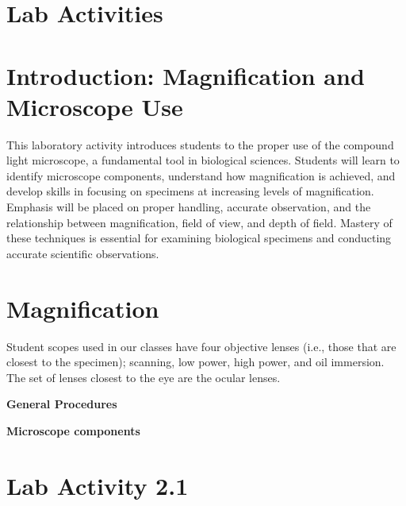 \documentclass[
  letterpaper,
  DIV=11,
  numbers=noendperiod]{scrreprt}
\begin{document}
\section{\texorpdfstring{\textbf{Lab
Activities}}{Lab Activities}}\label{lab-activities}

\section{\texorpdfstring{\textbf{Introduction: Magnification and
Microscope
Use}}{Introduction: Magnification and Microscope Use}}\label{introduction-magnification-and-microscope-use}

This laboratory activity introduces students to the proper use of the
compound light microscope, a fundamental tool in biological sciences.
Students will learn to identify microscope components, understand how
magnification is achieved, and develop skills in focusing on specimens
at increasing levels of magnification. Emphasis will be placed on proper
handling, accurate observation, and the relationship between
magnification, field of view, and depth of field. Mastery of these
techniques is essential for examining biological specimens and
conducting accurate scientific observations.

\section{\texorpdfstring{\textbf{Magnification}}{Magnification}}\label{magnification}

Student scopes used in our classes have four objective lenses (i.e.,
those that are closest to the specimen); scanning, low power, high
power, and oil immersion. The set of lenses closest to the eye are the
ocular lenses.

\textbf{General Procedures}

\textbf{Microscope components}

\section{\texorpdfstring{\textbf{Lab Activity
2.1}}{Lab Activity 2.1}}\label{lab-activity-2.1}
\end{document}
